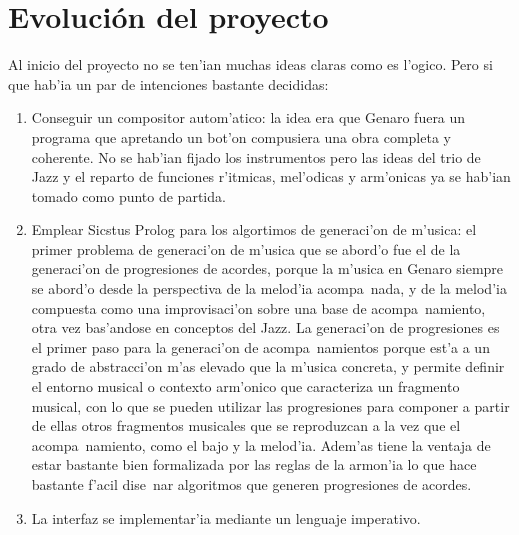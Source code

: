\section{Evoluci\'on del proyecto}
Al inicio del proyecto no se ten'ian muchas ideas claras como es l'ogico. Pero si que hab'ia un par de intenciones bastante decididas:
        \begin{enumerate}
        \item Conseguir un compositor autom'atico: la idea era que Genaro fuera un programa que apretando un bot'on compusiera una obra completa y coherente. No se hab'ian fijado los instrumentos pero las ideas del trio de Jazz y el reparto de funciones r'itmicas, mel'odicas y arm'onicas ya se hab'ian tomado como punto de partida. 
        \item Emplear Sicstus Prolog para los algortimos de generaci'on de m'usica: el primer problema de generaci'on de m'usica que se abord'o fue el de la generaci'on de progresiones de acordes, porque la m'usica en Genaro siempre se abord'o desde la perspectiva de la melod'ia acompa~nada, y de la melod'ia compuesta como una improvisaci'on sobre una base de acompa~namiento, otra vez bas'andose en conceptos del Jazz. 
\newline
La generaci'on de progresiones es el primer paso para la generaci'on de acompa~namientos porque est'a a un grado de abstracci'on m'as elevado que la m'usica concreta, y permite definir el entorno musical o contexto arm'onico que caracteriza un fragmento musical, con lo que se pueden utilizar las progresiones para componer a partir de ellas otros fragmentos musicales que se reproduzcan a la vez que el acompa~namiento, como el bajo y la melod'ia. Adem'as tiene la ventaja de estar bastante bien formalizada por las reglas de la armon'ia lo que hace bastante f'acil dise~nar algoritmos que generen progresiones de acordes.
        \item La interfaz se implementar'ia mediante un lenguaje imperativo.
        \end{enumerate}

